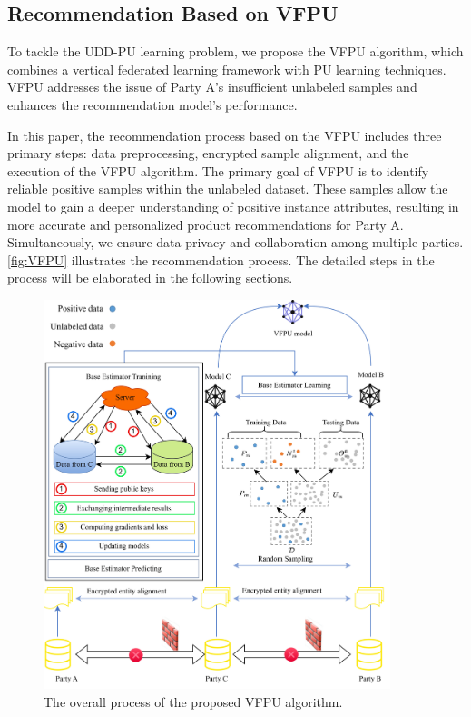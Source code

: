 \documentclass[10pt,journal,compsoc]{IEEEtran}
\begin{document}
	\subsection{Recommendation Based on VFPU}To tackle the UDD-PU learning problem, we propose the VFPU algorithm, which combines a vertical federated learning framework with PU learning techniques. VFPU addresses the issue of Party A's insufficient unlabeled samples and enhances the recommendation model's performance. 

In this paper, the recommendation process based on the VFPU includes three primary steps: data preprocessing, encrypted sample alignment, and the execution of the VFPU algorithm. The primary goal of VFPU is to identify reliable positive samples within the unlabeled dataset. These samples allow the model to gain a deeper understanding of positive instance attributes, resulting in more accurate and personalized product recommendations for Party A. Simultaneously, we ensure data privacy and collaboration among multiple parties. \autoref{fig:VFPU} illustrates the recommendation process. The detailed steps in the process will be elaborated in the following sections.
\begin{figure}[!htbp]
	\centering
	\captionsetup{size=footnotesize}
	\includegraphics[width=0.9\textwidth]{./Figure 1 in JEPG format}
	\caption{The overall process of the proposed VFPU algorithm.}
	\label{fig:VFPU}
\end{figure}
\end{document}

